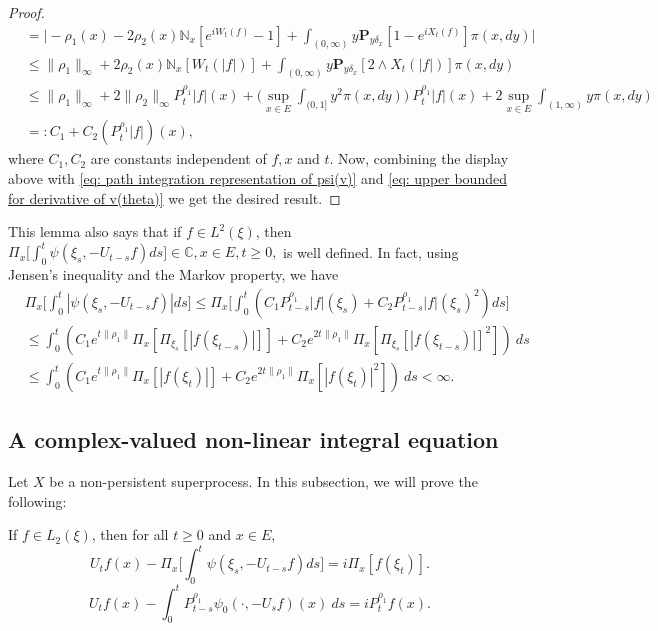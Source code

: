 \documentclass[EJP]{ejpecp} %
\begin{document}
\begin{proof}
\begin{align}
    & = \Big| - \rho_1(x)- 2\rho_2(x)\mathbb N_x[e^{i W_t(f)} - 1]  + \int_{(0,\infty)} y \mathbf P_{y \delta_x}[1-e^{i X_t(f)}] \pi(x,dy) \Big| \\
    & \leq \|\rho_1\|_\infty + 2\rho_2(x)\mathbb N_x[W_t(|f|)]+ \int_{(0,\infty)} y\mathbf P_{y\delta_x}[2\wedge X_t(|f|)] \pi(x,dy) \\
    & \leq \|\rho_1\|_\infty + 2\|\rho_2\|_\infty P^{\rho_1}_t |f|(x) + \Big(\sup_{x\in E}\int_{(0,1]}y^2 \pi(x,dy)\Big)~P^{\rho_1}_t |f|(x) + 2\sup_{x\in E}\int_{(1,\infty)} y \pi(x,dy) \\
    & =: C_1 + C_2(P^{\rho_1}_t |f|)(x), \label{eq: upper bound of psi'(v)}
\end{align}
	where $C_1, C_2$ are constants independent of $f,x$ and $t$.
	Now, combining the display above with \eqref{eq: path integration representation of psi(v)} and \eqref{eq: upper bounded for derivative of v(theta)} we get the desired result.
\end{proof}

	This lemma also says that if $f\in L^2(\xi)$, then $\Pi_x\Big[\int_0^t \psi(\xi_s,- U_{t-s}f)ds\Big] \in \mathbb C, x\in E, t\geq 0,$ is well defined.
	In fact, using Jensen's inequality and the Markov property, we have
\begin{align}
\label{eq: domination of psi(v)}
  	& \Pi_x\Big[\int_0^t |\psi (\xi_s,-U_{t-s}f )|ds\Big]
  	\leq \Pi_x\Big[\int_0^t (C_1 P_{t-s}^{\rho_1}|f|(\xi_s)+C_2 P_{t-s}^{\rho_1}|f|(\xi_s)^2 )ds\Big] \\
  	& \leq \int_0^t (C_1 e^{t\|\rho_1\|}\Pi_x [ \Pi_{\xi_s}[|f(\xi_{t-s})|] ]+C_2 e^{2t\|\rho_1\|}\Pi_x [ \Pi_{\xi_s}[|f (\xi_{t-s})|]^2 ] )~ds \\
  	& \leq \int_0^t (C_1 e^{t\|\rho_1\|}\Pi_x [ |f(\xi_{t})|]+C_2e^{2t\|\rho_1\|}\Pi_x [ |f (\xi_{t})|^2 ])~ds < \infty.
\end{align}

\subsection{A complex-valued non-linear integral equation}
	Let $X$ be a non-persistent superprocess.
	In this subsection, we will prove the following:

\begin{proposition}
\label{prop: complex FKPP-equation}
  	If $f\in L_2(\xi)$,  then for all $t\geq 0$ and $x\in E$,
\begin{equation}
\label{eq: complex FKPP-equation}
  	U_tf(x) - \Pi_x \Big[\int_0^t \psi (\xi_s, - U_{t-s}f ) ds \Big]
  	= i \Pi_x [f(\xi_t)].
\end{equation}
\begin{equation}
\label{eq: complex FKPP-equation with FK-transform}
  	U_tf(x) -  \int_0^t P_{t-s}^{\rho_1} \psi_0(\cdot,-U_sf) (x)~ds
  	= iP_t^{\rho_1} f(x).
\end{equation}
\end{proposition}
\end{document}
